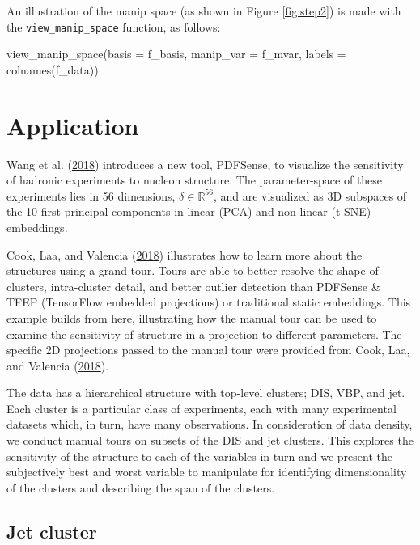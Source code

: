 \noindent An illustration of the manip space (as shown in Figure
\ref{fig:step2}) is made with the \texttt{view\_manip\_space} function,
as follows:

\begin{Schunk}
\begin{Sinput}

view_manip_space(basis = f_basis, 
                 manip_var = f_mvar, 
                 labels = colnames(f_data))
\end{Sinput}
\end{Schunk}

\hypertarget{sec:application}{%
\section{Application}\label{sec:application}}

Wang et al. (\protect\hyperlink{ref-wang_mapping_2018}{2018}) introduces
a new tool, PDFSense, to visualize the sensitivity of hadronic
experiments to nucleon structure. The parameter-space of these
experiments lies in 56 dimensions, \(\delta \in \mathbb{R}^{56}\), and
are visualized as 3D subspaces of the 10 first principal components in
linear (PCA) and non-linear (t-SNE) embeddings.

Cook, Laa, and Valencia
(\protect\hyperlink{ref-cook_dynamical_2018}{2018}) illustrates how to
learn more about the structures using a grand tour. Tours are able to
better resolve the shape of clusters, intra-cluster detail, and better
outlier detection than PDFSense \& TFEP (TensorFlow embedded
projections) or traditional static embeddings. This example builds from
here, illustrating how the manual tour can be used to examine the
sensitivity of structure in a projection to different parameters. The
specific 2D projections passed to the manual tour were provided from
Cook, Laa, and Valencia
(\protect\hyperlink{ref-cook_dynamical_2018}{2018}).

The data has a hierarchical structure with top-level clusters; DIS, VBP,
and jet. Each cluster is a particular class of experiments, each with
many experimental datasets which, in turn, have many observations. In
consideration of data density, we conduct manual tours on subsets of the
DIS and jet clusters. This explores the sensitivity of the structure to
each of the variables in turn and we present the subjectively best and
worst variable to manipulate for identifying dimensionality of the
clusters and describing the span of the clusters.

\hypertarget{jet-cluster}{%
\subsection{Jet cluster}\label{jet-cluster}}

